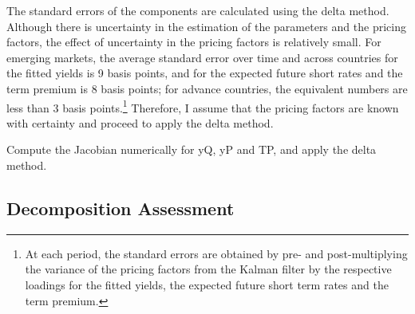 {The standard errors of the components are calculated using the delta method.
Although there is uncertainty in the estimation of the parameters and the pricing factors, the effect of uncertainty in the pricing factors is relatively small.
For emerging markets, the average standard error over time and across countries for the fitted yields is 9 basis points, and for the expected future short rates and the term premium is 8 basis points; for advance countries, the equivalent numbers are less than 3 basis points.\footnote{ At each period, the standard errors are obtained by pre- and post-multiplying the variance of the pricing factors from the Kalman filter by the respective loadings for the fitted yields, the expected future short term rates and the term premium.}
Therefore, I assume that the pricing factors are known with certainty and proceed to apply the delta method.

Compute the Jacobian numerically for yQ, yP and TP, and apply the delta method.




\subsection{Decomposition Assessment}
\iftoggle{toclinks}{\gototoc}{} %

}

